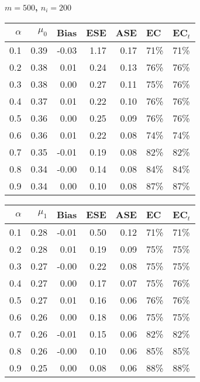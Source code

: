 \documentclass[12pt, letterpaper]{article}
\begin{document}
\clearpage



\begin{center}
	\textbf{$m=500$, $n_i=200$} 
\end{center}
\begin{table}[ht!]
	\centering
	\bgroup
	\def\arraystretch{1.25}
	\setlength\tabcolsep{0.05in}
	\begin{tabular}{rrrrrll}
		\hline
		$\alpha$ & $\mu_0$ & Bias & ESE & ASE & EC & EC$_t$ \\ 
		\hline
		0.1 & 0.39 & -0.03 & 1.17 & 0.17 & 71\% & 71\% \\ 
		0.2 & 0.38 & 0.01 & 0.24 & 0.13 & 76\% & 76\% \\ 
		0.3 & 0.38 & 0.00 & 0.27 & 0.11 & 75\% & 76\% \\ 
		0.4 & 0.37 & 0.01 & 0.22 & 0.10 & 76\% & 76\% \\ 
		0.5 & 0.36 & 0.00 & 0.25 & 0.09 & 76\% & 76\% \\ 
		0.6 & 0.36 & 0.01 & 0.22 & 0.08 & 74\% & 74\% \\ 
		0.7 & 0.35 & -0.01 & 0.19 & 0.08 & 82\% & 82\% \\ 
		0.8 & 0.34 & -0.00 & 0.14 & 0.08 & 84\% & 84\% \\ 
		0.9 & 0.34 & 0.00 & 0.10 & 0.08 & 87\% & 87\% \\ 
		\hline
	\end{tabular}
	\egroup
	\quad 
	\bgroup
	\setlength\tabcolsep{0.05in}
	\def\arraystretch{1.25}
	\begin{tabular}{rrrrrll}
		\hline
		$\alpha$ & $\mu_1$ & Bias & ESE & ASE & EC & EC$_t$ \\
		\hline
		0.1 & 0.28 & -0.01 & 0.50 & 0.12 & 71\% & 71\% \\ 
		0.2 & 0.28 & 0.01 & 0.19 & 0.09 & 75\% & 75\% \\ 
		0.3 & 0.27 & -0.00 & 0.22 & 0.08 & 75\% & 75\% \\ 
		0.4 & 0.27 & 0.00 & 0.17 & 0.07 & 75\% & 76\% \\ 
		0.5 & 0.27 & 0.01 & 0.16 & 0.06 & 76\% & 76\% \\ 
		0.6 & 0.26 & 0.00 & 0.18 & 0.06 & 75\% & 75\% \\ 
		0.7 & 0.26 & -0.01 & 0.15 & 0.06 & 82\% & 82\% \\ 
		0.8 & 0.26 & -0.00 & 0.10 & 0.06 & 85\% & 85\% \\ 
		0.9 & 0.25 & 0.00 & 0.08 & 0.06 & 88\% & 88\% \\ 
		\hline
	\end{tabular}

\end{table}
\end{document}
